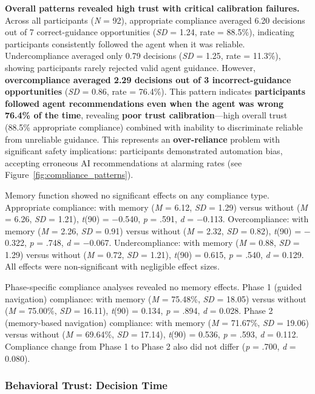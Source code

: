 \documentclass[12pt]{article}
\begin{document}
\textbf{Overall patterns revealed high trust with critical calibration failures.} Across all participants (\textit{N} = 92), appropriate compliance averaged 6.20 decisions out of 7 correct-guidance opportunities (\textit{SD} = 1.24, rate = 88.5\%), indicating participants consistently followed the agent when it was reliable. Undercompliance averaged only 0.79 decisions (\textit{SD} = 1.25, rate = 11.3\%), showing participants rarely rejected valid agent guidance. However, \textbf{overcompliance averaged 2.29 decisions out of 3 incorrect-guidance opportunities} (\textit{SD} = 0.86, rate = 76.4\%). This pattern indicates \textbf{participants followed agent recommendations even when the agent was wrong 76.4\% of the time}, revealing \textbf{poor trust calibration}---high overall trust (88.5\% appropriate compliance) combined with inability to discriminate reliable from unreliable guidance. This represents an \textbf{over-reliance} problem with significant safety implications: participants demonstrated automation bias, accepting erroneous AI recommendations at alarming rates (see Figure~\ref{fig:compliance_patterns}).

Memory function showed no significant effects on any compliance type. Appropriate compliance: with memory (\textit{M} = 6.12, \textit{SD} = 1.29) versus without (\textit{M} = 6.26, \textit{SD} = 1.21), \textit{t}(90) = $-$0.540, \textit{p} = .591, \textit{d} = $-$0.113. Overcompliance: with memory (\textit{M} = 2.26, \textit{SD} = 0.91) versus without (\textit{M} = 2.32, \textit{SD} = 0.82), \textit{t}(90) = $-$0.322, \textit{p} = .748, \textit{d} = $-$0.067. Undercompliance: with memory (\textit{M} = 0.88, \textit{SD} = 1.29) versus without (\textit{M} = 0.72, \textit{SD} = 1.21), \textit{t}(90) = 0.615, \textit{p} = .540, \textit{d} = 0.129. All effects were non-significant with negligible effect sizes.

Phase-specific compliance analyses revealed no memory effects. Phase 1 (guided navigation) compliance: with memory (\textit{M} = 75.48\%, \textit{SD} = 18.05) versus without (\textit{M} = 75.00\%, \textit{SD} = 16.11), \textit{t}(90) = 0.134, \textit{p} = .894, \textit{d} = 0.028. Phase 2 (memory-based navigation) compliance: with memory (\textit{M} = 71.67\%, \textit{SD} = 19.06) versus without (\textit{M} = 69.64\%, \textit{SD} = 17.14), \textit{t}(90) = 0.536, \textit{p} = .593, \textit{d} = 0.112. Compliance change from Phase 1 to Phase 2 also did not differ (\textit{p} = .700, \textit{d} = 0.080).

\subsubsection{Behavioral Trust: Decision Time}
\end{document}
